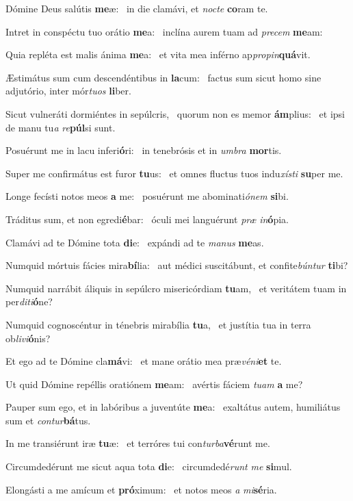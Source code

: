\item Dómine Deus salútis \textbf{me}æ:~\psstar{} in die clamávi, et \textit{nocte} \textbf{co}ram te.
\item Intret in conspéctu tuo orátio \textbf{me}a:~\psstar{} inclína aurem tuam ad \textit{precem} \textbf{me}am:
\item Quia repléta est malis ánima \textbf{me}a:~\psstar{} et vita mea inférno ap\textit{propin}\textbf{quá}vit.
\item Æstimátus sum cum descendéntibus in \textbf{la}cum:~\psstar{} factus sum sicut homo sine adjutório, inter mór\textit{tuos} \textbf{li}ber.
\item Sicut vulneráti dormiéntes in sepúlcris,~\pscross{} quorum non es memor \textbf{ám}plius:~\psstar{} et ipsi de manu tu\textit{a} \textit{re}\textbf{púl}si sunt.
\item Posuérunt me in lacu inferi\textbf{ó}ri:~\psstar{} in tenebrósis et in \textit{umbra} \textbf{mor}tis.
\item Super me confirmátus est furor \textbf{tu}us:~\psstar{} et omnes fluctus tuos indu\textit{xísti} \textbf{su}per me.
\item Longe fecísti notos meos \textbf{a} me:~\psstar{} posuérunt me abominati\textit{ónem} \textbf{si}bi.
\item Tráditus sum, et non egredi\textbf{é}bar:~\psstar{} óculi mei languérunt \textit{præ} \textit{in}\textbf{ó}pia.
\item Clamávi ad te Dómine tota \textbf{di}e:~\psstar{} expándi ad te \textit{manus} \textbf{me}as.
\item Numquid mórtuis fácies mira\textbf{bí}lia:~\psstar{} aut médici suscitábunt, et confite\textit{búntur} \textbf{ti}bi?
\item Numquid narrábit áliquis in sepúlcro misericórdiam \textbf{tu}am,~\psstar{} et veritátem tuam in per\textit{diti}\textbf{ó}ne?
\item Numquid cognoscéntur in ténebris mirabília \textbf{tu}a,~\psstar{} et justítia tua in terra ob\textit{livi}\textbf{ó}nis?
\item Et ego ad te Dómine cla\textbf{má}vi:~\psstar{} et mane orátio mea præ\textit{véni}\textbf{et} te.
\item Ut quid Dómine repéllis oratiónem \textbf{me}am:~\psstar{} avértis fáciem \textit{tuam} \textbf{a} me?
\item Pauper sum ego, et in labóribus a juventúte \textbf{me}a:~\psstar{} exaltátus autem, humiliátus sum et \textit{contur}\textbf{bá}tus.
\item In me transiérunt iræ \textbf{tu}æ:~\psstar{} et terróres tui con\textit{turba}\textbf{vé}runt me.
\item Circumdedérunt me sicut aqua tota \textbf{di}e:~\psstar{} circumdedé\textit{runt} \textit{me} \textbf{si}mul.
\item Elongásti a me amícum et \textbf{pró}ximum:~\psstar{} et notos meos \textit{a} \textit{mi}\textbf{sé}ria.
